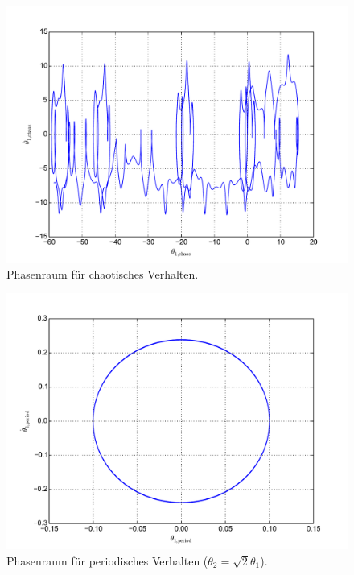 \begin{figure}[H]
	\includegraphics[width = \textwidth]{../Plots/Plot_2_A_2_Phasenraum.pdf}
	\caption{Phasenraum für chaotisches Verhalten.\label{fig:phasenraum2}}
\end{figure}

\begin{figure}[H]
	\includegraphics[width = \textwidth]{../Plots/Plot_2_A_3_Phasenraum.pdf}
	\caption{Phasenraum für periodisches Verhalten ($\theta_2=\sqrt{2}\theta_1$).\label{fig:phasenraum3}}
\end{figure}

\newpage\newpage
